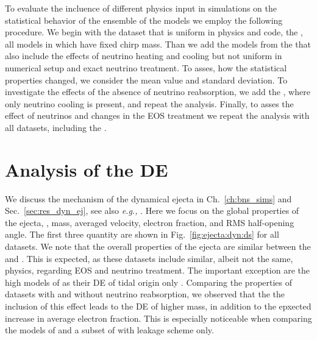 To evaluate the incluence of different physics input in simulations 
on the statistical behavior of the ensemble of the models we employ the following procedure.
We begin with the dataset that is uniform in physics and code, the \DSrefset{},
all models in which have fixed chirp mass.
Than we add the models from the \DSheatcool{} that also include the effects of neutrino 
heating and cooling but not uniform in numerical setup and exact neutrino treatment.
To asses, how the statistical properties changed, we consider the mean value and standard deviation.
To investigate the effects of the absence of neutrino reabsorption, we add the \DScool{},  
where only neutrino cooling is present, and repeat the analysis.
Finally, to asses the effect of neutrinos and changes in the \ac{EOS} treatment 
we repeat the analysis with all datasets, including the \DSnone{}.


\section{Analysis of the \ac{DE}}
\label{sec:res_stat_dynej}

We discuss the mechanism of the dynamical ejecta in Ch.~\ref{ch:bns_sims} and Sec.~\ref{sec:res_dyn_ej},
see also \textit{e.g.,} \citet{Radice:2020ddv,Bernuzzi:2020tgt,Shibata:2019wef}. 
Here we focus on the global properties of the ejecta, \ie, mass, averaged velocity, 
electron fraction, and \ac{RMS} half-opening angle. 
The first three quantity are shown in Fig.~\ref{fig:ejecta:dyn:ds} for all datasets.
We note that the overall properties of the ejecta are similar between the \DSrefset{} and
\DSheatcool{}. This is expected, as these datasets include similar, albeit not the same, physics,
regarding \ac{EOS} and neutrino treatment.
The important exception are the high \mr{} models of \DSrefset{} as their \ac{DE} of tidal 
origin only \cite{Bernuzzi:2020txg}.
Comparing the properties of datasets with and without neutrino reabsorption, we observed that the 
the inclusion of this effect leads to the \ac{DE} of higher mass, in addition to the epxected increase 
in average electron fraction. This is especially noticeable when comparing the models of \DSrefset{} 
and a subset of \citet{Radice:2018pdn} with leakage scheme only.

